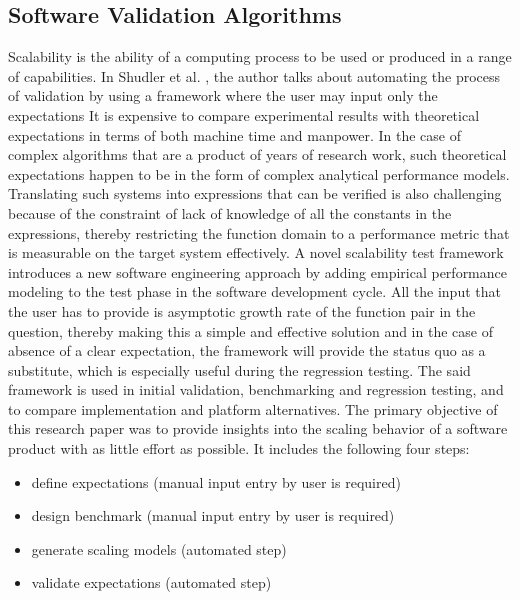 \documentclass[journal, onecolumn]{IEEEtran}
\begin{document}
	\subsection{Software Validation Algorithms}
	\bigskip
	Scalability is the ability of a computing process to be used or produced in a range of capabilities.
	\newline \newline
	In Shudler et al. \cite{algo}, the author talks about automating the process of validation by using a framework where the user may input only the expectations 
	\newline \newline
	It is expensive to compare experimental results with theoretical expectations in terms of both machine time and manpower. In the case of complex algorithms that are a product of years of research work, such theoretical expectations happen to be in the form of complex analytical performance models. Translating such systems into expressions that can be verified is also challenging because of the constraint of lack of knowledge of all the constants in the expressions, thereby restricting the function domain to a performance metric that is measurable on the target system effectively.
	\newline \newline
	A novel scalability test framework introduces a new software engineering approach by adding empirical performance modeling to the test phase in the software development cycle. All the input that the user has to provide is asymptotic growth rate of the function pair in the question, thereby making this a simple and effective solution and in the case of absence of a clear expectation, the framework will provide the status quo as a substitute, which is especially useful during the regression testing. The said framework is used in initial validation, benchmarking and regression testing, and to compare implementation and platform alternatives.
	\newline \newline
	The primary objective of this research paper was to provide insights into the scaling behavior of a software product with as little effort as possible. It includes the following four steps:
	\begin{itemize}
		\item define expectations (manual input entry by user is required)
		\item design benchmark (manual input entry by user is required)
		\item generate scaling models (automated step)
		\item validate expectations (automated step)
	\end{itemize}
	\bigskip
\end{document}
